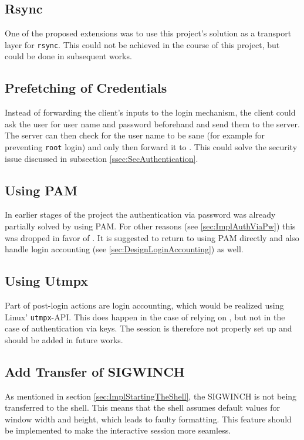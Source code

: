 \documentclass[10pt,a4paper,titlepage,twoside,english,final]{zhawreprt}
\begin{document}
\subsection{Rsync}\label{ssec:Rsync}
One of the proposed extensions was to use this project's solution as a transport layer for \texttt{rsync}.
This could not be achieved in the course of this project, but could be done in subsequent works.

\subsection{Prefetching of Credentials}\label{ssec:PrefetchingOfCredentials}
Instead of forwarding the client's inputs to the \gls{login} mechanism, the client could ask the user for user name and password beforehand and send them to the server.
The server can then check for the user name to be sane (for example for preventing \texttt{root} login) and only then forward it to \cite{login}.
This could solve the security issue discussed in subsection \ref{ssec:SecAuthentication}.

\subsection{Using PAM}\label{ssec:UsingPAM}
In earlier stages of the project the authentication via password was already partially solved by using \gls{PAM}.
For other reasons (see \ref{sec:ImplAuthViaPw}) this was dropped in favor of \cite{login}.
It is suggested to return to using \gls{PAM} directly and also handle \gls{login} accounting (see \ref{sec:DesignLoginAccounting}) as well.

\subsection{Using Utmpx}\label{ssec:UsingUtmpx}
Part of post-\gls{login} actions are \gls{login} accounting, which would be realized using \gls{Linux}' \texttt{utmpx}-\gls{API}.
This does happen in the case of relying on \cite{login}, but not in the case of authentication via keys.
The session is therefore not properly set up and should be added in future works.

\subsection{Add Transfer of SIGWINCH}\label{ssec:AddTransferOfSIGWINCH}
As mentioned in section \ref{sec:ImplStartingTheShell}, the \gls{SIGWINCH} is not being transferred to the \gls{shell}.
This means that the \gls{shell} assumes default values for window width and height, which leads to faulty formatting.
This feature should be implemented to make the interactive session more seamless.
\end{document}
